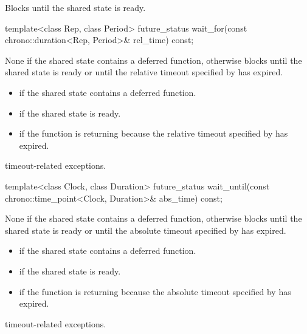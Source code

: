 \begin{itemdescr}
\pnum
{}%
\effects
Blocks until the shared state is ready.
\end{itemdescr}

%
\begin{itemdecl}
template<class Rep, class Period>
  future_status wait_for(const chrono::duration<Rep, Period>& rel_time) const;
\end{itemdecl}

\begin{itemdescr}
\pnum
{}%
\effects
None if the shared state contains a deferred function,
otherwise
blocks until the shared state is ready or until
the relative timeout specified by
 has expired.

\pnum
\returns

\begin{itemize}
\item {} if the shared state contains a deferred
function.

\item {} if the shared state is ready.

\item {} if the function is returning because the
relative timeout
specified by  has expired.
\end{itemize}

\pnum
\throws
timeout-related exceptions.
\end{itemdescr}

%
\begin{itemdecl}
template<class Clock, class Duration>
  future_status wait_until(const chrono::time_point<Clock, Duration>& abs_time) const;
\end{itemdecl}

\begin{itemdescr}
\pnum
{}%
\effects
None if the shared state contains a deferred function,
otherwise
blocks until the shared state is ready or until the
absolute timeout specified by
 has expired.

\pnum
\returns

\begin{itemize}
\item {} if the shared state contains a deferred
function.

\item {} if the shared state is ready.

\item {} if the function is returning because the
absolute timeout
specified by  has expired.
\end{itemize}

\pnum
\throws
timeout-related exceptions.
\end{itemdescr}

